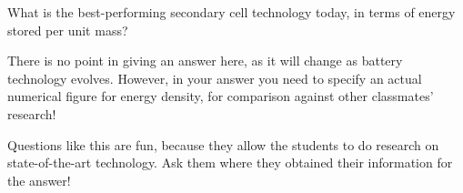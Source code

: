 

What is the best-performing secondary cell technology today, in terms of energy stored per unit mass?







There is no point in giving an answer here, as it will change as battery technology evolves.  However, in your answer you need to specify an actual numerical figure for energy density, for comparison against other classmates' research!







Questions like this are fun, because they allow the students to do research on state-of-the-art technology.  Ask them where they obtained their information for the answer!




